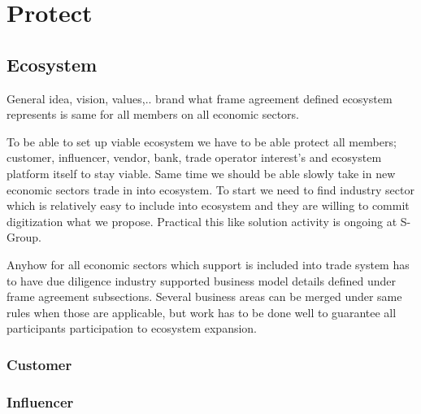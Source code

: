 %
%
%
\part{Protect}\label{protect}
\chapter{Ecosystem}\label{protect_ecosystem}
General idea, vision, values,.. brand what frame agreement defined ecosystem
represents is same for all members on all economic sectors.

To be able to set up viable ecosystem we have to be able protect all members;
customer, influencer, vendor, bank, trade operator interest's and ecosystem
platform itself to stay viable. Same time we should be able slowly take in new
economic sectors trade in into ecosystem. To start we need to find industry
sector which is relatively easy to include into ecosystem and they are willing
to commit digitization what we propose. Practical this like solution activity
is ongoing at S-Group\allowbreak\cite{PrismaFi}\allowbreak\cite{OmaSP}.

Anyhow for all economic sectors which support is included into trade system
has to have due diligence industry supported business model details defined
under frame agreement subsections. Several business areas can be merged under
same rules when those are applicable, but work has to be done well to
guarantee all participants participation to ecosystem expansion.

\section{Customer}\label{protect_customer}

\section{Influencer}\label{protect_influencer}

